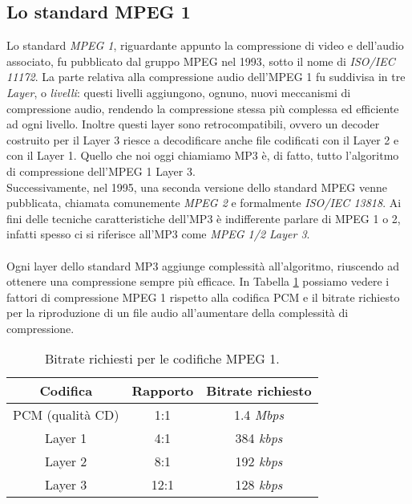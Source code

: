 		\subsection{Lo standard MPEG 1} \label{subsec:mpeg1}
		
			Lo standard \textit{MPEG 1}, riguardante appunto la compressione di video e dell'audio associato, fu pubblicato dal gruppo MPEG nel 1993, sotto il nome di \textit{ISO/IEC 11172}. La parte relativa alla compressione audio dell'MPEG 1 fu suddivisa in tre \textit{Layer}, o \textit{livelli}: questi livelli aggiungono, ognuno, nuovi meccanismi di compressione audio, rendendo la compressione stessa più complessa ed efficiente ad ogni livello. Inoltre questi layer sono retrocompatibili, ovvero un decoder costruito per il Layer 3 riesce a decodificare anche file codificati con il Layer 2 e con il Layer 1. Quello che noi oggi chiamiamo MP3 è, di fatto, tutto l'algoritmo di compressione dell'MPEG 1 Layer 3.\\
			Successivamente, nel 1995, una seconda versione dello standard MPEG venne pubblicata, chiamata comunemente \textit{MPEG 2} e formalmente \textit{ISO/IEC 13818}. Ai fini delle tecniche caratteristiche dell'MP3 è indifferente parlare di MPEG 1 o 2, infatti spesso ci si riferisce all'MP3 come \textit{MPEG 1/2 Layer 3}.\\
			\\
			Ogni layer dello standard MP3 aggiunge complessità all'algoritmo, riuscendo ad ottenere una compressione sempre più efficace. In Tabella \ref{tab:bitrate} possiamo vedere i fattori di compressione MPEG 1 rispetto alla codifica PCM e il bitrate richiesto per la riproduzione di un file audio all'aumentare della complessità di compressione.
			
			\begin{table}[h!]
				\centering
				\begin{tabular}{|c|c|c|}
					\multicolumn{1}{c}{\textbf{Codifica}} & \multicolumn{1}{c}{\textbf{Rapporto}} & \multicolumn{1}{c}{\textbf{Bitrate richiesto}}\\
					\hline
					PCM (qualità CD) & 1:1 & 1.4 \textit{Mbps}\\
					\hline
					Layer 1 & 4:1 & 384 \textit{kbps}\\
					\hline
					Layer 2 & 8:1 & 192 \textit{kbps}\\
					\hline
					Layer 3 & 12:1 & 128 \textit{kbps}\\
					\hline
				\end{tabular}
				\caption{Bitrate richiesti per le codifiche MPEG 1.}
				\label{tab:bitrate}
			\end{table}
			
